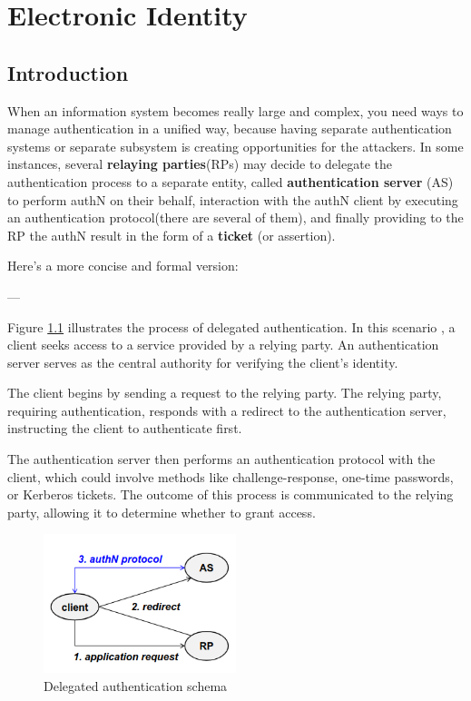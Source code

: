 \chapter{Electronic Identity}

\section{Introduction}
When an information system becomes really large and complex, you need
ways to manage authentication in a unified way, because having
separate authentication systems or separate subsystem is creating
opportunities for the attackers.
In some instances, several \textbf{relaying parties}(RPs) may decide
to delegate the authentication process to a separate entity,
called \textbf{authentication server} (AS) to perform authN on their
behalf, interaction with the authN client by executing an
authentication protocol(there are several of them), and finally
providing to the RP the authN result in the form of a \textbf{ticket}
(or assertion).

Here’s a more concise and formal version:  

---

Figure \ref{fig:delegated-auth} illustrates the process of delegated
authentication. In this scenario , a client seeks access to a service
provided by a relying party. An authentication server serves as the
central authority for verifying the client’s identity.  

The client begins by sending a request to the relying party. The
relying party, requiring authentication, responds with a redirect to
the authentication server, instructing the client to authenticate
first.  

The authentication server then performs an authentication protocol
with the client, which could involve methods like challenge-response,
one-time passwords, or Kerberos tickets. The outcome of this process
is communicated to the relying party, allowing it to determine whether
to grant access.  

\begin{figure}[h]
  \centering
  \includegraphics[width=0.5\textwidth]{img/delegated auth.png}
  \caption{Delegated authentication schema}
  \label{fig:delegated-auth}
\end{figure}


